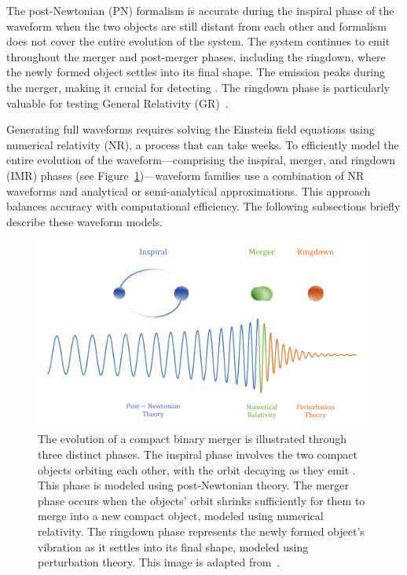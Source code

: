 The post-Newtonian (PN) formalism is accurate during the inspiral phase of the waveform when the two objects are still distant from each other and formalism does not cover the entire evolution of the system. The system continues to emit \gws throughout the merger and post-merger phases, including the ringdown, where the newly formed object settles into its final shape. The \gwadj emission peaks during the merger, making it crucial for detecting \gws. The ringdown phase is particularly valuable for testing General Relativity (GR)~\cite{GW150914_TGR:2016, GW170817_TGR:2019, O3_TGR:2021}.

Generating full waveforms requires solving the Einstein field equations using numerical relativity (NR), a process that can take weeks. To efficiently model the entire evolution of the waveform---comprising the inspiral, merger, and ringdown (IMR) phases (see Figure~\ref{1:fig:IMR})---waveform families use a combination of NR waveforms and analytical or semi-analytical approximations. This approach balances accuracy with computational efficiency. The following subsections briefly describe these waveform models.

\begin{figure}
    \centering
    \includegraphics[width=0.75\linewidth]{images/1_general_relativity/modelling_cbc/IMR.pdf}
    \caption{The evolution of a compact binary merger is illustrated through three distinct phases. The inspiral phase involves the two compact objects orbiting each other, with the orbit decaying as they emit \gws. This phase is modeled using post-Newtonian theory. The merger phase occurs when the objects' orbit shrinks sufficiently for them to merge into a new compact object, modeled using numerical relativity. The ringdown phase represents the newly formed object's vibration as it settles into its final shape, modeled using perturbation theory. This image is adapted from~\cite{IMR_plot:2016}.}
    \label{1:fig:IMR}
\end{figure}

